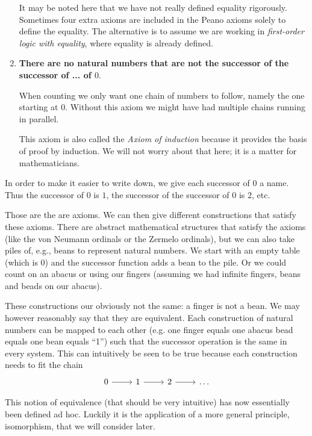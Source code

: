 \begin{enumerate}
It may be noted here that we have not really defined equality rigorously. Sometimes four extra axioms are included in the Peano axioms solely to define the equality. The alternative is to assume we are working in \textit{first-order logic with equality}, where equality is already defined.

\item \textbf{There are no natural numbers that are not the successor of the successor of ... of $0$}.

When counting we only want one chain of numbers to follow, namely the one starting at $0$. Without this axiom we might have had multiple chains running in parallel.

This axiom is also called the \emph{Axiom of induction} because it provides the basis of proof by induction. We will not worry about that here; it is a matter for mathematicians.
\end{enumerate}

In order to make it easier to write down, we give each successor of $0$ a name. Thus the successor of $0$ is $1$, the successor of the successor of $0$ is $2$, etc.

Those are the are axioms. We can then give different constructions that satisfy these axioms. There are abstract mathematical structures that satisfy the axioms (like the von Neumann ordinals or the Zermelo ordinals), but we can also take piles of, e.g., beans to represent natural numbers. We start with an empty table (which is $0$) and the successor function adds a bean to the pile. Or we could count on an abacus or using our fingers (assuming we had infinite fingers, beans and beads on our abacus).

These constructions our obviously not the same: a finger is not a bean. We may however reasonably say that they are equivalent. Each construction of natural numbers can be mapped to each other (e.g. one finger equals one abacus bead equals one bean equals ``1'') such that the successor operation is the same in every system. This can intuitively be seen to be true because each construction needs to fit the chain
\[ \begin{tikzcd}0 \rar{} & 1 \rar{} & 2 \rar{} & \ldots\end{tikzcd} \]

This notion of equivalence (that should be very intuitive) has now essentially been defined ad hoc. Luckily it is the application of a more general principle, isomorphism, that we will consider later.

